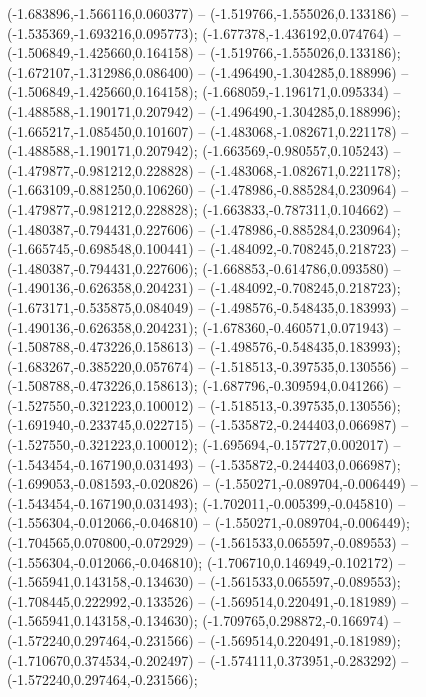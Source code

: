  (-1.683896,-1.566116,0.060377) -- (-1.519766,-1.555026,0.133186) -- (-1.535369,-1.693216,0.095773);
 (-1.677378,-1.436192,0.074764) -- (-1.506849,-1.425660,0.164158) -- (-1.519766,-1.555026,0.133186);
 (-1.672107,-1.312986,0.086400) -- (-1.496490,-1.304285,0.188996) -- (-1.506849,-1.425660,0.164158);
 (-1.668059,-1.196171,0.095334) -- (-1.488588,-1.190171,0.207942) -- (-1.496490,-1.304285,0.188996);
 (-1.665217,-1.085450,0.101607) -- (-1.483068,-1.082671,0.221178) -- (-1.488588,-1.190171,0.207942);
 (-1.663569,-0.980557,0.105243) -- (-1.479877,-0.981212,0.228828) -- (-1.483068,-1.082671,0.221178);
 (-1.663109,-0.881250,0.106260) -- (-1.478986,-0.885284,0.230964) -- (-1.479877,-0.981212,0.228828);
 (-1.663833,-0.787311,0.104662) -- (-1.480387,-0.794431,0.227606) -- (-1.478986,-0.885284,0.230964);
 (-1.665745,-0.698548,0.100441) -- (-1.484092,-0.708245,0.218723) -- (-1.480387,-0.794431,0.227606);
 (-1.668853,-0.614786,0.093580) -- (-1.490136,-0.626358,0.204231) -- (-1.484092,-0.708245,0.218723);
 (-1.673171,-0.535875,0.084049) -- (-1.498576,-0.548435,0.183993) -- (-1.490136,-0.626358,0.204231);
 (-1.678360,-0.460571,0.071943) -- (-1.508788,-0.473226,0.158613) -- (-1.498576,-0.548435,0.183993);
 (-1.683267,-0.385220,0.057674) -- (-1.518513,-0.397535,0.130556) -- (-1.508788,-0.473226,0.158613);
 (-1.687796,-0.309594,0.041266) -- (-1.527550,-0.321223,0.100012) -- (-1.518513,-0.397535,0.130556);
 (-1.691940,-0.233745,0.022715) -- (-1.535872,-0.244403,0.066987) -- (-1.527550,-0.321223,0.100012);
 (-1.695694,-0.157727,0.002017) -- (-1.543454,-0.167190,0.031493) -- (-1.535872,-0.244403,0.066987);
 (-1.699053,-0.081593,-0.020826) -- (-1.550271,-0.089704,-0.006449) -- (-1.543454,-0.167190,0.031493);
 (-1.702011,-0.005399,-0.045810) -- (-1.556304,-0.012066,-0.046810) -- (-1.550271,-0.089704,-0.006449);
 (-1.704565,0.070800,-0.072929) -- (-1.561533,0.065597,-0.089553) -- (-1.556304,-0.012066,-0.046810);
 (-1.706710,0.146949,-0.102172) -- (-1.565941,0.143158,-0.134630) -- (-1.561533,0.065597,-0.089553);
 (-1.708445,0.222992,-0.133526) -- (-1.569514,0.220491,-0.181989) -- (-1.565941,0.143158,-0.134630);
 (-1.709765,0.298872,-0.166974) -- (-1.572240,0.297464,-0.231566) -- (-1.569514,0.220491,-0.181989);
 (-1.710670,0.374534,-0.202497) -- (-1.574111,0.373951,-0.283292) -- (-1.572240,0.297464,-0.231566);
